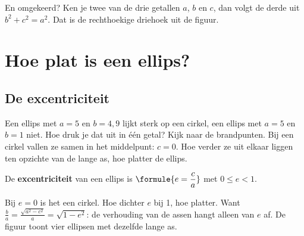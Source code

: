 
En omgekeerd? Ken je twee van de drie getallen $a$, $b$ en $c$, dan volgt de derde uit $b^2 + c^2 = a^2$. Dat is de rechthoekige driehoek uit de figuur.


\begin{oefeningen}

\end{oefeningen}

\section{Hoe plat is een ellips?}

\subsection{De excentriciteit}

Een ellips met $a = 5$ en $b = 4{,}9$ lijkt sterk op een cirkel, een ellips met $a = 5$ en $b = 1$ niet. Hoe druk je dat uit in één getal? Kijk naar de brandpunten. Bij een cirkel vallen ze samen in het middelpunt: $c = 0$. Hoe verder ze uit elkaar liggen ten opzichte van de lange as, hoe platter de ellips.

\begin{theorie}
De \textbf{\textcolor{accent}{excentriciteit}} van een ellips is \qquad $\formule{e = \dfrac ca}$ \qquad met $0 \leqslant e < 1$.
\end{theorie}

Bij $e = 0$ is het een cirkel. Hoe dichter $e$ bij 1, hoe platter. Want $\tfrac ba = \tfrac{\sqrt{a^2 - c^2}}{a} = \sqrt{1 - e^2}$: de verhouding van de assen hangt alleen van $e$ af. De figuur toont vier ellipsen met dezelfde lange as.


